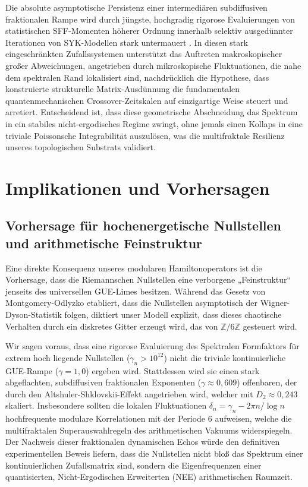 \documentclass[aps,prl,preprint,superscriptaddress,floatfix]{revtex4-2}
\newcommand{\Zmod}{\mathbb{Z}/6\mathbb{Z}}
\begin{document}
Die absolute asymptotische Persistenz einer intermediären subdiffusiven fraktionalen Rampe wird durch jüngste, hochgradig rigorose Evaluierungen von statistischen SFF-Momenten höherer Ordnung innerhalb selektiv ausgedünnter Iterationen von SYK-Modellen stark untermauert \cite{Legramandi2024}. In diesen stark eingeschränkten Zufallssystemen unterstützt das Auftreten makroskopischer großer Abweichungen, angetrieben durch mikroskopische Fluktuationen, die nahe dem spektralen Rand lokalisiert sind, nachdrücklich die Hypothese, dass konstruierte strukturelle Matrix-Ausdünnung die fundamentalen quantenmechanischen Crossover-Zeitskalen auf einzigartige Weise steuert und arretiert. Entscheidend ist, dass diese geometrische Abschneidung das Spektrum in ein stabiles nicht-ergodisches Regime zwingt, ohne jemals einen Kollaps in eine triviale Poissonsche Integrabilität auszulösen, was die multifraktale Resilienz unseres topologischen Substrats validiert.

\section{Implikationen und Vorhersagen}

\subsection{Vorhersage für hochenergetische Nullstellen und arithmetische Feinstruktur}

Eine direkte Konsequenz unseres modularen Hamiltonoperators ist die Vorhersage, dass die Riemannschen Nullstellen eine verborgene „Feinstruktur“ jenseits des universellen GUE-Limes besitzen. Während das Gesetz von Montgomery-Odlyzko etabliert, dass die Nullstellen asymptotisch der Wigner-Dyson-Statistik folgen, diktiert unser Modell explizit, dass dieses chaotische Verhalten durch ein diskretes Gitter erzeugt wird, das von $\Zmod$ gesteuert wird.

Wir sagen voraus, dass eine rigorose Evaluierung des Spektralen Formfaktors für extrem hoch liegende Nullstellen ($\gamma_n > 10^{12}$) nicht die triviale kontinuierliche GUE-Rampe ($\gamma = 1,0$) ergeben wird. Stattdessen wird sie einen stark abgeflachten, subdiffusiven fraktionalen Exponenten ($\gamma \approx 0,609$) offenbaren, der durch den Altshuler-Shklovskii-Effekt angetrieben wird, welcher mit $D_2 \approx 0,243$ skaliert. Insbesondere sollten die lokalen Fluktuationen $\delta_n = \gamma_n - 2\pi n/\log n$ hochfrequente modulare Korrelationen mit der Periode 6 aufweisen, welche die multifraktalen Superauswahlregeln des arithmetischen Vakuums widerspiegeln. Der Nachweis dieser fraktionalen dynamischen Echos würde den definitiven experimentellen Beweis liefern, dass die Nullstellen nicht bloß das Spektrum einer kontinuierlichen Zufallsmatrix sind, sondern die Eigenfrequenzen einer quantisierten, Nicht-Ergodischen Erweiterten (NEE) arithmetischen Raumzeit.
\end{document}
